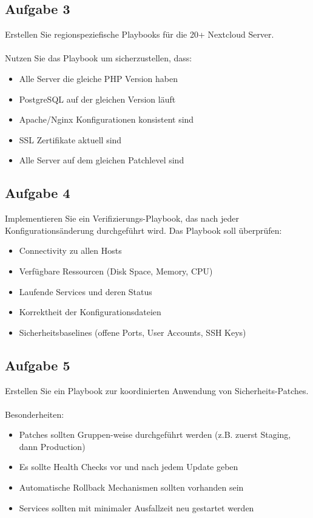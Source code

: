 \documentclass{article}
\begin{document}
    \subsection{Aufgabe 3}
    Erstellen Sie regionspeziefische Playbooks für die 20+ Nextcloud Server.
    \\ \\
    Nutzen Sie das Playbook um sicherzustellen, dass:
    \begin{itemize}
        \item Alle Server die gleiche PHP Version haben
        \item PostgreSQL auf der gleichen Version läuft
        \item Apache/Nginx Konfigurationen konsistent sind
        \item SSL Zertifikate aktuell sind
        \item Alle Server auf dem gleichen Patchlevel sind
    \end{itemize}

    \subsection{Aufgabe 4}
    Implementieren Sie ein Verifizierungs-Playbook, das nach jeder Konfigurationsänderung durchgeführt wird.
    Das Playbook soll überprüfen:
    \begin{itemize}
        \item Connectivity zu allen Hosts
        \item Verfügbare Ressourcen (Disk Space, Memory, CPU)
        \item Laufende Services und deren Status
        \item Korrektheit der Konfigurationsdateien
        \item Sicherheitsbaselines (offene Ports, User Accounts, SSH Keys)
    \end{itemize}

    \subsection{Aufgabe 5}
    Erstellen Sie ein Playbook zur koordinierten Anwendung von Sicherheits-Patches.
    \\ \\
    Besonderheiten:
    \begin{itemize}
        \item Patches sollten Gruppen-weise durchgeführt werden (z.B. zuerst Staging, dann Production)
        \item Es sollte Health Checks vor und nach jedem Update geben
        \item Automatische Rollback Mechanismen sollten vorhanden sein
        \item Services sollten mit minimaler Ausfallzeit neu gestartet werden
    \end{itemize}
\end{document}
